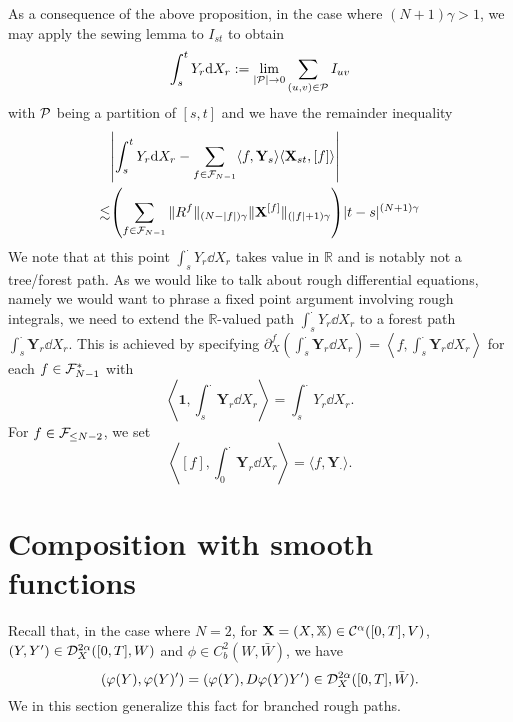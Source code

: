 \documentclass[11pt]{style/preprint}
\begin{document}
As a consequence of the above proposition, in the case where \((N + 1) \gamma > 1\), we may apply the sewing 
lemma to \(I_{st}\) to obtain 
\[\int_s^t Y_r \dd X_r := \lim_{|{\mathcal P}| \to 0} \sum_{(u, v) \in {\mathcal P}} I_{uv}\]
with \({\mathcal P}\) being a partition of \([s, t]\) and we have the remainder inequality 
\begin{align*}
  & \left|\int_s^t Y_r \dd X_r - \sum_{f \in \CF_{N - 1}} \langle f, \mathbf{Y}_s\rangle \langle \mathbf{X}_{st}, [f]\rangle\right|\\
  \lesssim & \left(\sum_{f \in \CF_{N - 1}} \|R^f\|_{(N - |f|)\gamma} \|\mathbf{X}^{[f]}\|_{(|f| + 1)\gamma}\right)|t - s|^{(N + 1)\gamma}
\end{align*}
We note that at this point \(\int_s^{\cdot} Y_r \dd X_r\) takes value in \(\mathbb{R}\) and is notably not a tree/forest 
path. As we would like to talk about rough differential equations, namely we would want to phrase a fixed point 
argument involving rough integrals, we need to extend the \(\mathbb{R}\)-valued path \(\int_s^{\cdot} Y_r \dd X_r\) 
to a forest path \(\int_s^{\cdot} \mathbf{Y}_r \dd X_r\). This is achieved by specifying 
\(\partial^f_X \left(\int_s^{\cdot} \mathbf{Y}_r \dd X_r\right) = \left\langle f, \int_s^{\cdot} \mathbf{Y}_r \dd X_r \right\rangle\) 
for each \(f \in {\mathcal F}_{N - 1}^*\) with 
\[\left\langle \mathbf{1}, \int_s^{\cdot} \mathbf{Y}_r \dd X_r \right\rangle = \int_s^{\cdot} Y_r \dd X_r.\]
For \(f \in {\mathcal F}_{\le N - 2}\), we set 
\[\left\langle [f], \int_0^{\cdot} \mathbf{Y}_r \dd X_r \right\rangle = \langle f, \mathbf{Y}_{\cdot}\rangle.\]

\section{Composition with smooth functions}

Recall that, in the case where \(N = 2\), for \(\mathbf{X} = (X, \mathbb{X}) \in {\mathcal C}^{\alpha}([0, T], V)\), 
\((Y, Y') \in {\mathcal D}_X^{2\alpha}([0, T], W)\) and \(\phi \in C^2_b(W, \bar W)\), we have 
\[(\varphi(Y), \varphi(Y)') = (\varphi(Y), D\varphi(Y) Y') \in {\mathcal D}_X^{2\alpha}([0, T], \bar W).\]
We in this section generalize this fact for branched rough paths.
\end{document}
